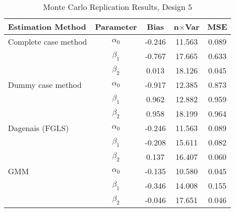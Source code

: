 \begin{table}
\centering
\caption{Monte Carlo Replication Results, Design 5}
\label{table:MCReplicationResultsDesign5}
\begin{tabular}{lcccc}
\toprule
Estimation Method & Parameter & Bias & n$\times$Var & MSE \\
\midrule
Complete case method & $\alpha_0$ & -0.246 & 11.563 & 0.089 \\
 & $\beta_1$ & -0.767 & 17.665 & 0.633 \\
 & $\beta_2$ & 0.013 & 18.126 & 0.045 \\
Dummy case method & $\alpha_0$ & -0.917 & 12.385 & 0.873 \\
 & $\beta_1$ & 0.962 & 12.882 & 0.959 \\
 & $\beta_2$ & 0.958 & 18.199 & 0.964 \\
Dagenais (FGLS) & $\alpha_0$ & -0.246 & 11.563 & 0.089 \\
 & $\beta_1$ & -0.208 & 15.611 & 0.082 \\
 & $\beta_2$ & 0.137 & 16.407 & 0.060 \\
GMM & $\alpha_0$ & -0.135 & 10.580 & 0.045 \\
 & $\beta_1$ & -0.346 & 14.008 & 0.155 \\
 & $\beta_2$ & -0.046 & 17.651 & 0.046 \\
\bottomrule
\end{tabular}
\end{table}
